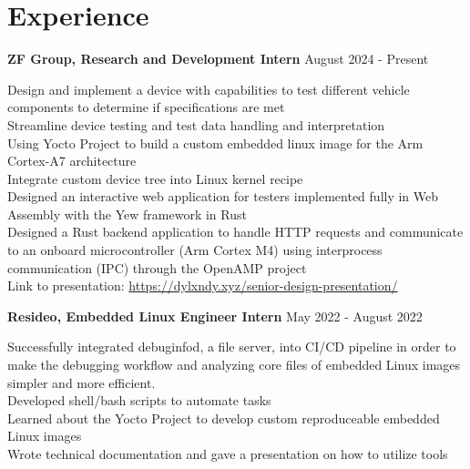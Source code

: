 \documentclass[letter,12pt]{article}
\begin{document}
\vspace{-1.0cm}
\section*{Experience} 
\begin{tcolorbox}
[colback=gray!25,
  leftrule=0pt,
  rightrule=0pt,
  sharp corners]
\textbf{ZF Group, Research and Development Intern} \hfill August 2024 - Present 
\end{tcolorbox}
\noindent\textbullet \- Design and implement a device with capabilities to test different vehicle components to determine if specifications are met\\
\textbullet \- Streamline device testing and test data handling and interpretation\\
\textbullet \- Using Yocto Project to build a custom embedded linux image for the Arm Cortex-A7 architecture \\
\textbullet \- Integrate custom device tree into Linux kernel recipe \\
\textbullet \- Designed an interactive web application for testers implemented fully in Web Assembly with the Yew framework in Rust \\
\textbullet \- Designed a Rust backend application to handle HTTP requests and communicate to an onboard microcontroller (Arm Cortex M4)
using interprocess communication (IPC) through the OpenAMP project\\
\textbullet \- Link to presentation: \textcolor{cyan}{\underline{\url{https://dylxndy.xyz/senior-design-presentation/}}}\\
\vspace{-.5cm}
\begin{tcolorbox}
[colback=gray!25,
  leftrule=0pt,
  rightrule=0pt,
  sharp corners]
\noindent\textbf{Resideo, Embedded Linux
Engineer Intern} \hfill May 2022 - August 2022 
\end{tcolorbox}
\noindent\textbullet \- Successfully integrated
debuginfod, a file server, into CI/CD pipeline in order to make the debugging
workflow and analyzing core files of embedded Linux images simpler and more
efficient.\\
\textbullet \- Developed shell/bash scripts to automate tasks\\
\textbullet \- Learned about the Yocto Project to develop custom reproduceable 
embedded Linux images\\
\textbullet \- Wrote technical documentation and gave a presentation on 
how to utilize tools\\
\end{document}
